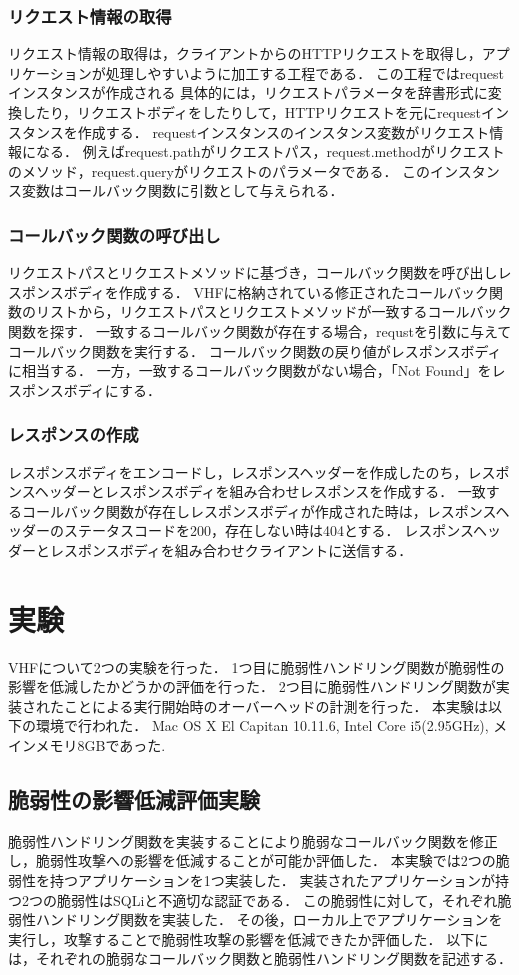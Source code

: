 \documentclass[a4paper,12pt]{jreport}
\begin{document}
\subsection{リクエスト情報の取得}
リクエスト情報の取得は，クライアントからのHTTPリクエストを取得し，アプリケーションが処理しやすいように加工する工程である．
この工程ではrequestインスタンスが作成される
具体的には，リクエストパラメータを辞書形式に変換したり，リクエストボディをしたりして，HTTPリクエストを元にrequestインスタンスを作成する．
requestインスタンスのインスタンス変数がリクエスト情報になる．
例えばrequest.pathがリクエストパス，request.methodがリクエストのメソッド，request.queryがリクエストのパラメータである．
このインスタンス変数はコールバック関数に引数として与えられる．

\subsection{コールバック関数の呼び出し}
リクエストパスとリクエストメソッドに基づき，コールバック関数を呼び出しレスポンスボディを作成する．
VHFに格納されている修正されたコールバック関数のリストから，リクエストパスとリクエストメソッドが一致するコールバック関数を探す．
一致するコールバック関数が存在する場合，requstを引数に与えてコールバック関数を実行する．
コールバック関数の戻り値がレスポンスボディに相当する．
一方，一致するコールバック関数がない場合，「Not Found」をレスポンスボディにする．

\subsection{レスポンスの作成}
レスポンスボディをエンコードし，レスポンスヘッダーを作成したのち，レスポンスヘッダーとレスポンスボディを組み合わせレスポンスを作成する．
一致するコールバック関数が存在しレスポンスボディが作成された時は，レスポンスヘッダーのステータスコードを200，存在しない時は404とする．
レスポンスヘッダーとレスポンスボディを組み合わせクライアントに送信する．

\chapter{実験}
VHFについて2つの実験を行った．
1つ目に脆弱性ハンドリング関数が脆弱性の影響を低減したかどうかの評価を行った．
2つ目に脆弱性ハンドリング関数が実装されたことによる実行開始時のオーバーヘッドの計測を行った．
本実験は以下の環境で行われた．
Mac OS X El Capitan 10.11.6, Intel Core i5(2.95GHz), メインメモリ8GBであった.

\section{脆弱性の影響低減評価実験}
脆弱性ハンドリング関数を実装することにより脆弱なコールバック関数を修正し，脆弱性攻撃への影響を低減することが可能か評価した．
本実験では2つの脆弱性を持つアプリケーションを1つ実装した．
実装されたアプリケーションが持つ2つの脆弱性はSQLiと不適切な認証である．
この脆弱性に対して，それぞれ脆弱性ハンドリング関数を実装した．
その後，ローカル上でアプリケーションを実行し，攻撃することで脆弱性攻撃の影響を低減できたか評価した．
以下には，それぞれの脆弱なコールバック関数と脆弱性ハンドリング関数を記述する．
\end{document}
